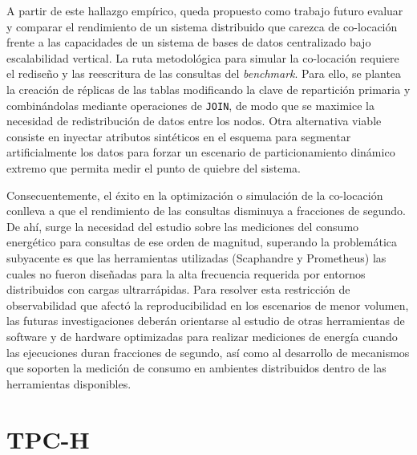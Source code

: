 \documentclass[12pt, letter paper]{report}
\renewcommand{\thechapter}{\Roman{chapter}}
\renewcommand{\thesection}{\arabic{chapter}.\arabic{section}}
\renewcommand{\thetable}{\arabic{chapter}.\arabic{table}}
\renewcommand{\thefigure}{\arabic{chapter}.\arabic{figure}}
\begin{document}
  A partir de este hallazgo empírico, queda propuesto como trabajo futuro
  evaluar y comparar el rendimiento de un sistema distribuido que carezca de
  co-locación frente a las capacidades de un sistema de bases de datos
  centralizado bajo escalabilidad vertical. La ruta metodológica para simular la
  co-locación requiere el rediseño y las reescritura de las consultas del
  \textit{benchmark}. Para ello, se plantea la creación de réplicas de las
  tablas modificando la clave de repartición primaria y combinándolas mediante
  operaciones de \texttt{JOIN}, de modo que se maximice la necesidad de
  redistribución de datos entre los nodos. Otra alternativa viable consiste en
  inyectar atributos sintéticos en el esquema para segmentar artificialmente los
  datos para forzar un escenario de particionamiento dinámico extremo que
  permita medir el punto de quiebre del sistema.

  Consecuentemente, el éxito en la optimización o simulación de la co-locación
  conlleva a que el rendimiento de las consultas disminuya a fracciones de
  segundo. De ahí, surge la necesidad del estudio sobre las mediciones del
  consumo energético para consultas de ese orden de magnitud, superando la
  problemática subyacente es que las herramientas utilizadas (Scaphandre y
  Prometheus) las cuales no fueron diseñadas para la alta frecuencia requerida
  por entornos distribuidos con cargas ultrarrápidas. Para resolver esta
  restricción de observabilidad que afectó la reproducibilidad en los escenarios
  de menor volumen, las futuras investigaciones deberán orientarse al estudio de
  otras herramientas de software y de hardware optimizadas para realizar
  mediciones de energía cuando las ejecuciones duran fracciones de segundo, así
  como al desarrollo de mecanismos que soporten la medición de consumo en
  ambientes distribuidos dentro de las herramientas disponibles.

  
  \renewcommand{\bibname}{Referencias}
  
  \nocite{*}

  \appendix
  \renewcommand{\thesection}{\thechapter.\arabic{section}}
  \renewcommand{\thesubsection}{\thechapter.\arabic{subsection}}
  \renewcommand{\thesubsubsection}{\thechapter.\arabic{subsubsection}}
  \renewcommand{\thefigure}{\thechapter.\arabic{figure}}
  \renewcommand{\thetable}{\thechapter.\arabic{table}}

  \chapter{TPC-H}
  \label{apx:tpch}
\end{document}
